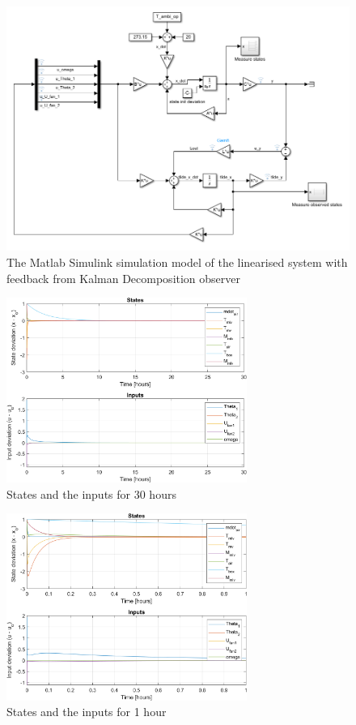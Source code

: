 \begin{figure}[h!]
	\centering
	\includegraphics[width=1\textwidth]{Graphics/fig_modelSS_obs.png}
	\caption{The Matlab Simulink simulation model of the linearised system with feedback from Kalman Decomposition observer}
	\label{fig:sim_modelSS_obs}
\end{figure}

\begin{figure}[h!]
	\centering
	\includegraphics[width=0.7\textwidth]{Graphics/fig_stateInput30h.png}
	\caption{States and the inputs for 30 hours}
	\label{fig:sim_stateInput30h}
\end{figure}

\begin{figure}[h!]
	\centering
	\includegraphics[width=0.7\textwidth]{Graphics/fig_stateInput1h.png}
	\caption{States and the inputs for 1 hour}
	\label{fig:sim_stateInput1h}
\end{figure}

